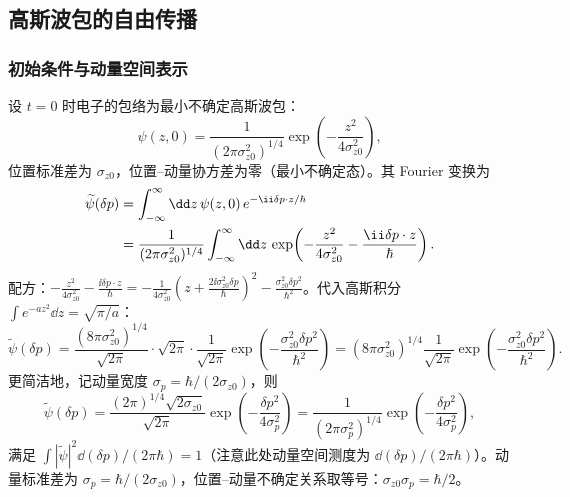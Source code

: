 \subsection{高斯波包的自由传播}

\subsubsection{初始条件与动量空间表示}

设 $t=0$ 时电子的包络为最小不确定高斯波包：
\begin{equation}
\psi(z,0)=\frac{1}{(2\pi\sigma_{z0}^2)^{1/4}}
\exp\!\left(-\frac{z^2}{4\sigma_{z0}^2}\right),
\label{eq:feqo-initial-gaussian}
\end{equation}
位置标准差为 $\sigma_{z0}$，位置--动量协方差为零（最小不确定态）。其 Fourier 变换为
\begin{align}
\widetilde\psi(\delta p)&=\int_{-\infty}^{\infty}\dd z\,\psi(z,0)\,e^{-\ii \delta p\cdot z/\hbar}\notag\\
&=\frac{1}{(2\pi\sigma_{z0}^2)^{1/4}}
\int_{-\infty}^{\infty}\dd z\,
\exp\!\left(-\frac{z^2}{4\sigma_{z0}^2}-\frac{\ii\delta p\cdot z}{\hbar}\right).
\label{eq:feqo-gaussian-fourier-1}
\end{align}
配方：$-\frac{z^2}{4\sigma_{z0}^2}-\frac{\ii\delta p\cdot z}{\hbar}=-\frac{1}{4\sigma_{z0}^2}\left(z+\frac{2\ii\sigma_{z0}^2\delta p}{\hbar}\right)^2-\frac{\sigma_{z0}^2\delta p^2}{\hbar^2}$。代入高斯积分 $\int e^{-az^2}\dd z=\sqrt{\pi/a}$：
\begin{equation}
\widetilde\psi(\delta p)=\frac{(8\pi\sigma_{z0}^2)^{1/4}}{\sqrt{2\pi}}\cdot\sqrt{2\pi}\cdot\frac{1}{\sqrt{2\pi}}
\exp\!\left(-\frac{\sigma_{z0}^2\delta p^2}{\hbar^2}\right)
=(8\pi\sigma_{z0}^2)^{1/4}\frac{1}{\sqrt{2\pi}}
\exp\!\left(-\frac{\sigma_{z0}^2\delta p^2}{\hbar^2}\right).
\label{eq:feqo-gaussian-momentum}
\end{equation}
更简洁地，记动量宽度 $\sigma_p=\hbar/(2\sigma_{z0})$，则
\begin{equation}
\widetilde\psi(\delta p)=\frac{(2\pi)^{1/4}\sqrt{2\sigma_{z0}}}{\sqrt{2\pi}}
\exp\!\left(-\frac{\delta p^2}{4\sigma_p^2}\right)
=\frac{1}{(2\pi\sigma_p^2)^{1/4}}
\exp\!\left(-\frac{\delta p^2}{4\sigma_p^2}\right),
\label{eq:feqo-gaussian-momentum-clean}
\end{equation}
满足 $\int|\widetilde\psi|^2\dd(\delta p)/(2\pi\hbar)=1$（注意此处动量空间测度为 $\dd(\delta p)/(2\pi\hbar)$）。动量标准差为 $\sigma_p=\hbar/(2\sigma_{z0})$，位置--动量不确定关系取等号：$\sigma_{z0}\sigma_p=\hbar/2$。


